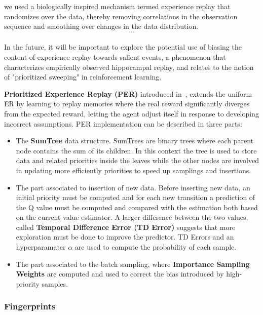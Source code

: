 \documentclass[11pt, a4paper, hidelinks]{report}
\begin{document}
\begin{quoting}[font=itshape, begintext={"}, endtext={"\citep{human-level}}]
we used a biologically inspired mechanism termed experience replay that randomizes over the data, thereby removing correlations in the observation sequence and smoothing over changes in the data distribution.\\
\[\dots\]\\
In the future, it will be important to explore the potential use of biasing the content of experience replay towards salient events, a phenomenon that characterizes empirically observed hippocampal replay, and relates to the notion of "prioritized sweeping" in reinforcement learning.
\end{quoting}

\textbf{Prioritized Experience Replay (PER)} introduced in~\citep{prioritized}, extends the uniform ER by learning to replay memories where the real reward significantly diverges from the expected reward, letting the agent adjust itself in response to developing incorrect assumptions.
PER implementation can be described in three parts:
\begin{itemize}
	\item The \textbf{SumTree} data structure.
SumTrees are binary trees where each parent node contains the sum of its children.
In this context the tree is used to store data and related priorities inside the leaves while the other nodes are involved in updating more efficiently priorities to speed up samplings and insertions.
	\item The part associated to insertion of new data.
Before inserting new data, an initial priority must be computed and for each new transition a prediction of the Q value must be computed and compared with the estimation both based on the current value estimator.
A larger difference between the two values, called \textbf{Temporal Difference Error (TD Error)} suggests that more exploration must be done to improve the predictor.
TD Errors and an hyperparamater $\alpha$ are used to compute the probability of each sample.
	\item The part associated to the batch sampling, where \textbf{Importance Sampling Weights} are computed and used to correct the bias introduced by high-priority samples.
\end{itemize}

\subsubsection{Fingerprints}\label{subsubsec:fingerprints}
\end{document}

